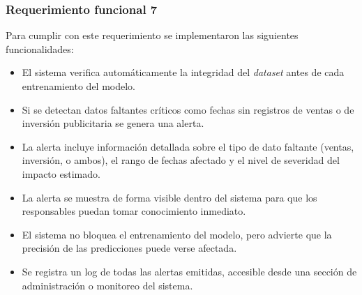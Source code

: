 \subsubsection{Requerimiento funcional 7}

Para cumplir con este requerimiento se implementaron las siguientes funcionalidades:

\begin{itemize}
    \item El sistema verifica automáticamente la integridad del \textit{dataset} antes de cada entrenamiento del modelo.
    \item Si se detectan datos faltantes críticos como fechas sin registros de ventas o de inversión publicitaria se genera una alerta.
    \item La alerta incluye información detallada sobre el tipo de dato faltante (ventas, inversión, o ambos), el rango de fechas afectado y el nivel de severidad del impacto estimado.
    \item La alerta se muestra de forma visible dentro del sistema para que los responsables puedan tomar conocimiento inmediato.
    \item El sistema no bloquea el entrenamiento del modelo, pero advierte que la precisión de las predicciones puede verse afectada.
    \item Se registra un log de todas las alertas emitidas, accesible desde una sección de administración o monitoreo del sistema.
\end{itemize}

